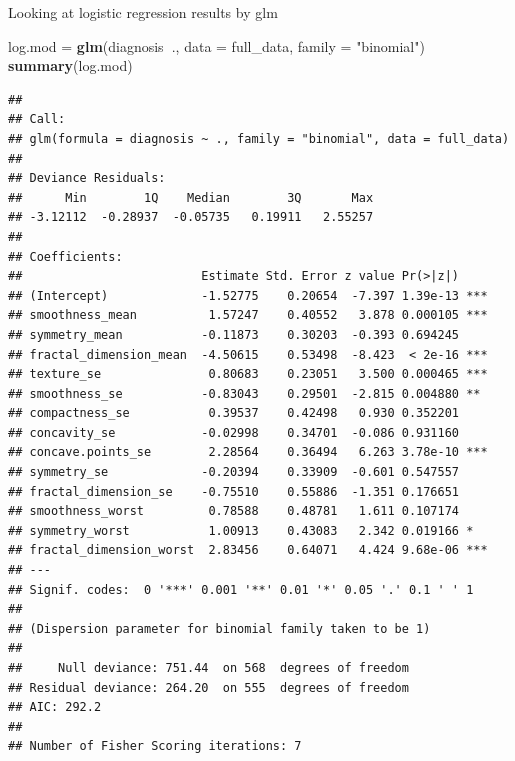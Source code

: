 \documentclass[]{article}
\newenvironment{Shaded}{\begin{snugshade}}{\end{snugshade}}
\newcommand{\DataTypeTok}[1]{\textcolor[rgb]{0.13,0.29,0.53}{#1}}
\newcommand{\DecValTok}[1]{\textcolor[rgb]{0.00,0.00,0.81}{#1}}
\newcommand{\KeywordTok}[1]{\textcolor[rgb]{0.13,0.29,0.53}{\textbf{#1}}}
\newcommand{\NormalTok}[1]{#1}
\newcommand{\OperatorTok}[1]{\textcolor[rgb]{0.81,0.36,0.00}{\textbf{#1}}}
\newcommand{\StringTok}[1]{\textcolor[rgb]{0.31,0.60,0.02}{#1}}
\begin{document}
Looking at logistic regression results by glm

\begin{Shaded}
\begin{Highlighting}[]
\NormalTok{log.mod =}\StringTok{ }\KeywordTok{glm}\NormalTok{(diagnosis}\OperatorTok{~}\NormalTok{., }\DataTypeTok{data =}\NormalTok{ full_data, }\DataTypeTok{family =} \StringTok{"binomial"}\NormalTok{)}
\KeywordTok{summary}\NormalTok{(log.mod)}
\end{Highlighting}
\end{Shaded}

\begin{verbatim}
## 
## Call:
## glm(formula = diagnosis ~ ., family = "binomial", data = full_data)
## 
## Deviance Residuals: 
##      Min        1Q    Median        3Q       Max  
## -3.12112  -0.28937  -0.05735   0.19911   2.55257  
## 
## Coefficients:
##                         Estimate Std. Error z value Pr(>|z|)    
## (Intercept)             -1.52775    0.20654  -7.397 1.39e-13 ***
## smoothness_mean          1.57247    0.40552   3.878 0.000105 ***
## symmetry_mean           -0.11873    0.30203  -0.393 0.694245    
## fractal_dimension_mean  -4.50615    0.53498  -8.423  < 2e-16 ***
## texture_se               0.80683    0.23051   3.500 0.000465 ***
## smoothness_se           -0.83043    0.29501  -2.815 0.004880 ** 
## compactness_se           0.39537    0.42498   0.930 0.352201    
## concavity_se            -0.02998    0.34701  -0.086 0.931160    
## concave.points_se        2.28564    0.36494   6.263 3.78e-10 ***
## symmetry_se             -0.20394    0.33909  -0.601 0.547557    
## fractal_dimension_se    -0.75510    0.55886  -1.351 0.176651    
## smoothness_worst         0.78588    0.48781   1.611 0.107174    
## symmetry_worst           1.00913    0.43083   2.342 0.019166 *  
## fractal_dimension_worst  2.83456    0.64071   4.424 9.68e-06 ***
## ---
## Signif. codes:  0 '***' 0.001 '**' 0.01 '*' 0.05 '.' 0.1 ' ' 1
## 
## (Dispersion parameter for binomial family taken to be 1)
## 
##     Null deviance: 751.44  on 568  degrees of freedom
## Residual deviance: 264.20  on 555  degrees of freedom
## AIC: 292.2
## 
## Number of Fisher Scoring iterations: 7
\end{verbatim}

\begin{Shaded}
\end{Shaded}
\end{document}
